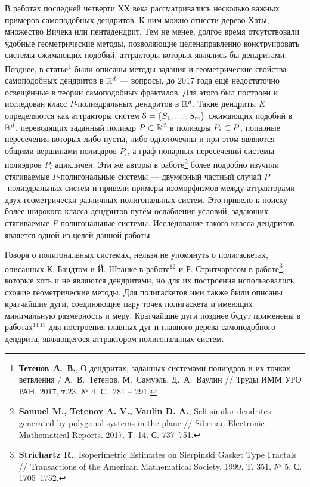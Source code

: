 \documentclass[a5paper,9pt,twoside]{extarticle} %
\begin{document}
В работах последней четверти ХХ века рассматривались несколько важных примеров самоподобных дендритов.
К ним можно отнести дерево Хаты, множество Вичека или пентадендрит.
Тем не менее, долгое время отсутствовали удобные геометрические методы, позволяющие целенаправленно конструировать системы сжимающих подобий, аттракторы которых являлись бы дендритами.
Позднее, в статье\footnote{{\bf Тетенов~А.~В.}, О дендритах, заданных системами полиэдров и их точках ветвления / А.~В.~Тетенов, М.~Самуэль, Д.~А.~Ваулин // Труды ИММ УРО РАН, 2017, т.23, № 4, С.~281 -- 291.} были описаны методы задания и геометрические свойства самоподобных дендритов в $\mathbb{R}^d$ --- вопросы, до 2017 года ещё недостаточно освещённые в теории самоподобных фракталов.
Для этого был построен и исследован класс $P$-полиэдральных дендритов в $\mathbb{R}^d$.
Такие дендриты $K$ определяются как аттракторы систем ${\EuScript S} = \{S_1,\ldots, S_m\}$ сжимающих подобий в $\mathbb{R}^d$, переводящих заданный полиэдр $P \subset \mathbb{R}^d$ в полиэдры $P_i \subset P$, попарные пересечения которых либо пусты, либо одноточечны и при этом являются общими вершинами полиэдров $P_i $, а граф попарных пересечений системы полиэдров $P_i$ ацикличен.
Эти же авторы в работе\footnote{{\bf Samuel M., Tetenov A. V., Vaulin D. A.}, Self-similar dendrites generated by polygonal systems in the plane // Siberian Electronic Mathematical Reports. 2017. Т. 14. С. 737--751.} более подробно изучили стягиваемые $P$-полигональные системы --- двумерный частный случай $P$-полиэдральных систем и привели
примеры изоморфизмов между аттракторами двух геометрически различных полигональных систем.
Это привело к поиску более широкого класса дендритов путём ослабления условий, задающих стягиваемые $P$-полигональные системы.
Исследование такого класса дендритов является одной из целей данной работы.

Говоря о полигональных системах, нельзя не упомянуть о полигаскетах, описанных К. Бандтом и Й. Штанке в работе$^{12}$ и Р. Стритчартсом в работе\footnote{{\bf Strichartz R.}, Isoperimetric Estimates on Sierpinski Gasket Type Fractals // Transactions of the American Mathematical Society. 1999. Т. 351. № 5. С. 1705--1752.}, которые хоть и не являются дендритами, но для их построения использовались схожие геометрические методы.
Для полигаскетов ими также были описаны кратчайшие дуги, соединяющие пару точек полигаскета и имеющих минимальную размерность и меру.
Кратчайшие дуги позднее будут применены в работах$^{14\ 15}$ для построения главных дуг и главного дерева самоподобного дендрита, являющегося аттрактором полигональных систем.
\end{document}

